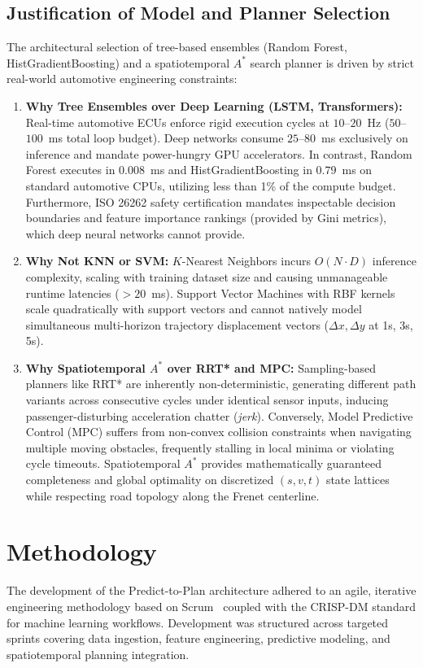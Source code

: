 \documentclass[runningheads]{llncs}
\begin{document}
\subsection{Justification of Model and Planner Selection}
The architectural selection of tree-based ensembles (Random Forest, HistGradientBoosting) and a spatiotemporal $A^*$ search planner is driven by strict real-world automotive engineering constraints:
\begin{enumerate}
    \item \textbf{Why Tree Ensembles over Deep Learning (LSTM, Transformers):} Real-time automotive ECUs enforce rigid execution cycles at $10$--$20$~Hz ($50$--$100$~ms total loop budget). Deep networks consume $25$--$80$~ms exclusively on inference and mandate power-hungry GPU accelerators. In contrast, Random Forest executes in $0.008$~ms and HistGradientBoosting in $0.79$~ms on standard automotive CPUs, utilizing less than 1\% of the compute budget. Furthermore, ISO 26262 safety certification mandates inspectable decision boundaries and feature importance rankings (provided by Gini metrics), which deep neural networks cannot provide.
    \item \textbf{Why Not KNN or SVM:} $K$-Nearest Neighbors incurs $O(N \cdot D)$ inference complexity, scaling with training dataset size and causing unmanageable runtime latencies ($>20$~ms). Support Vector Machines with RBF kernels scale quadratically with support vectors and cannot natively model simultaneous multi-horizon trajectory displacement vectors ($\Delta x, \Delta y$ at 1s, 3s, 5s).
    \item \textbf{Why Spatiotemporal $A^*$ over RRT* and MPC:} Sampling-based planners like RRT* are inherently non-deterministic, generating different path variants across consecutive cycles under identical sensor inputs, inducing passenger-disturbing acceleration chatter (\textit{jerk}). Conversely, Model Predictive Control (MPC) suffers from non-convex collision constraints when navigating multiple moving obstacles, frequently stalling in local minima or violating cycle timeouts. Spatiotemporal $A^*$ provides mathematically guaranteed completeness and global optimality on discretized $(s, v, t)$ state lattices while respecting road topology along the Frenet centerline.
\end{enumerate}

%
%
%
\section{Methodology}
\label{sec:methodology}
The development of the Predict-to-Plan architecture adhered to an agile, iterative engineering methodology based on Scrum~\cite{sutherland2020scrum} coupled with the CRISP-DM standard for machine learning workflows. Development was structured across targeted sprints covering data ingestion, feature engineering, predictive modeling, and spatiotemporal planning integration.
\end{document}
